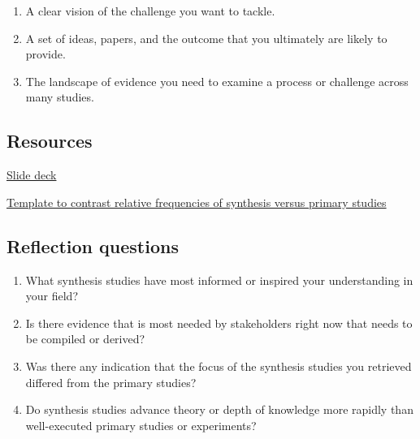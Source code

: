 \documentclass[
]{book}
\providecommand{\tightlist}{%
  \setlength{\itemsep}{0pt}\setlength{\parskip}{0pt}}
\begin{document}
\begin{enumerate}
\def\labelenumi{\arabic{enumi}.}
\tightlist
\item
  A clear vision of the challenge you want to tackle.\\
\item
  A set of ideas, papers, and the outcome that you ultimately are likely to provide.\\
\item
  The landscape of evidence you need to examine a process or challenge across many studies.
\end{enumerate}

\hypertarget{resources}{%
\subsection*{Resources}\label{resources}}

\href{https://figshare.com/articles/presentation/Synthesis_tools/16608544}{Slide deck}

\href{https://figshare.com/articles/dataset/A_tally_template_to_contrast_primary_and_synthesis_studies_for_a_specific_field_of_research/16608526}{Template to contrast relative frequencies of synthesis versus primary studies}

\hypertarget{reflection-questions}{%
\subsection*{Reflection questions}\label{reflection-questions}}

\begin{enumerate}
\def\labelenumi{\arabic{enumi}.}
\tightlist
\item
  What synthesis studies have most informed or inspired your understanding in your field?\\
\item
  Is there evidence that is most needed by stakeholders right now that needs to be compiled or derived?\\
\item
  Was there any indication that the focus of the synthesis studies you retrieved differed from the primary studies?\\
\item
  Do synthesis studies advance theory or depth of knowledge more rapidly than well-executed primary studies or experiments?
\end{enumerate}
\end{document}
